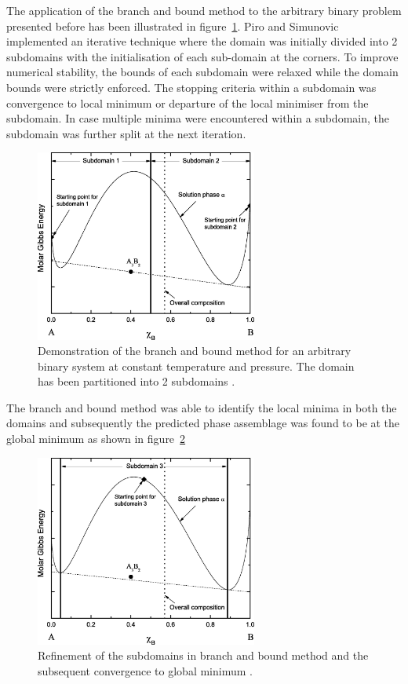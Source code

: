 	The application of the branch and bound method to the arbitrary binary problem presented before has been illustrated in figure~\ref{fig:BB_1}. Piro and Simunovic implemented an iterative technique where the domain was initially divided into 2 subdomains with the initialisation of each sub-domain at the corners. To improve numerical stability, the bounds of each subdomain were relaxed while the domain bounds were strictly enforced. The stopping criteria within a subdomain was convergence to local minimum or departure of the local minimiser from the subdomain. In case multiple minima were encountered within a subdomain, the subdomain was further split at the next iteration. 
	 
	\begin{figure}[htbp]
		\centering
		\includegraphics[width=0.65\textwidth]{figures/BB1}
		\caption{Demonstration of the branch and bound method for an arbitrary binary system at constant temperature and pressure. The domain has been partitioned into 2 subdomains \cite{Piro16}.}
		\label{fig:BB_1}
	\end{figure}
	
	The branch and bound method was able to identify the local minima in both the domains and subsequently the predicted phase assemblage was found to be at the global minimum as shown in figure~\ref{fig:BB_2}
	
		 \begin{figure}[htbp]
		\centering
		\includegraphics[width=0.65\textwidth]{figures/BB2}
		\caption{Refinement of the subdomains in branch and bound method and the subsequent convergence to global minimum \cite{Piro16}.}
		\label{fig:BB_2}
	\end{figure}


